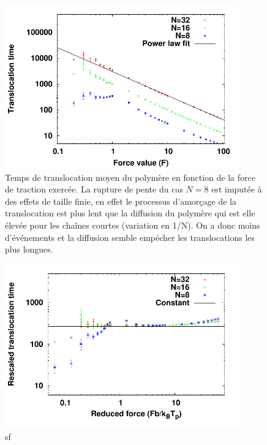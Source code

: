 \begin{figure}[H]
\begin{center}
\includegraphics[width=0.9\textwidth]{translocholebigger.pdf} 
\caption[Temps de translocation du polymère structuré avec un pore large]{Temps de translocation moyen du polymère en fonction de la force de traction exercée. La rupture de pente du cas $N=8$ est imputée à des effets de taille finie, en effet le processus d'amorçage de la translocation est plus lent que la diffusion du polymère qui est elle élevée pour les chaînes courtes (variation en 1/N). On a donc moins d'événements et la diffusion semble empécher les translocations les plus longues. }
\label{holebiggertau}
\end{center}
\end{figure}



\begin{figure}[H]
\begin{center}
\includegraphics[width=0.9\textwidth]{transloctaufrescholebigger.pdf} 
\caption[Temps de translocation réajusté du polymère structuré avec un pore large]{sf}
\label{holebiggerescale}
\end{center}
\end{figure}

